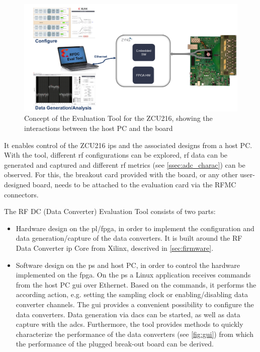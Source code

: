 \begin{figure}[tbh]
	\centering
	\includegraphics[width = \textwidth]{chap/04-work/img/zcu216evaltool}
	\caption[ZCU216 Evaluation Tool]{Concept of the Evaluation Tool for the ZCU216, showing the interactions between the host PC and the board}
	\label{fig:evalTool}
\end{figure}

It enables control of the ZCU216 \glspl{ip} and the associated designs from a host PC. 
With the tool, different \gls{rf} configurations can be explored, \gls{rf} data can be generated and captured and different \gls{rf} metrics (see \autoref{ssec:adc_charac}) can be observed.  
For this, the breakout card provided with the board, or any other user-designed board, needs to be attached to the evaluation card via the RFMC connectors.

The RF DC (Data Converter) Evaluation Tool consists of two parts:
\begin{itemize}
	\item Hardware design on the \gls{pl}/\gls{fpga}, in order to implement the configuration and data generation/capture of the data converters. It is built around the RF Data Converter \gls{ip} Core from Xilinx, descrived in \autoref{sec:firmware}.
	\item Software design on the \gls{ps} and host PC, in order to control the hardware implemented on the \gls{fpga}.
	On the \gls{ps} a Linux application receives commands from the host PC \gls{gui} over Ethernet. Based on the commands, it performs the according action, e.g. setting the sampling clock or enabling/disabling data converter channels. The \gls{gui} provides a convenient possibility to configure the data converters. Data generation via \glspl{dac} can be started, as well as data capture with the \glspl{adc}. Furthermore, the tool provides methods to quickly characterize the performance of the data converters (see \autoref{fig:gui}) from which the performance of the plugged break-out board can be derived.
\end{itemize}


